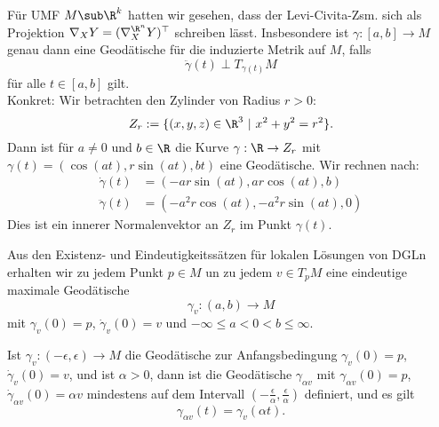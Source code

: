 \begin{beispiel}
Für UMF $M \sub \R^k$ hatten wir gesehen, dass der Levi-Civita-Zsm. sich als Projektion $\nabla_X Y = (\nabla_X^{\R^n} Y)^{\top}$ schreiben lässt. Insbesondere ist $\gamma: [a,b] \to M$ genau dann eine Geodätische für die induzierte Metrik auf $M$, falls 
\begin{equation}
\ddot{\gamma}(t) \perp T_{\gamma(t)} M
\end{equation} 
für alle $t \in [a,b]$ gilt.\\
Konkret: Wir betrachten den Zylinder von Radius $r>0$:
\begin{equation}
Z_r := \{ (x,y,z) \in \R^3 \ | \ x^2+y^2=r^2 \}.
\end{equation}
Dann ist für $a \neq 0$ und $b \in \R$ die Kurve $\gamma: \R \to Z_r$ mit $\gamma(t) = (\cos (at), r \sin (at), bt)$ eine Geodätische. Wir rechnen nach:
\begin{align}
\dot{\gamma}(t) &= (-ar \sin (at), ar \cos(at), b)\\
\ddot{\gamma}(t) &= (-a^2r \cos(at), -a^2 r \sin(at), 0)
\end{align}
Dies ist ein innerer Normalenvektor an $Z_r$ im Punkt $\gamma (t)$.
\end{beispiel}
Aus den Existenz- und Eindeutigkeitssätzen für lokalen Lösungen von DGLn erhalten wir zu jedem Punkt $p \in M$ un zu jedem $v \in T_pM$ eine eindeutige maximale Geodätische
\begin{equation}
\gamma_v : (a,b) \to M
\end{equation}
mit $\gamma_v(0)=p$, $\dot{\gamma}_v(0) = v$ und $- \infty \leq a <0 < b \leq \infty$.
\begin{lemma}{}{}
Ist $\gamma_v: (- \epsilon, \epsilon) \to M$ die Geodätische zur Anfangsbedingung $\gamma_v (0) = p$, $\dot{\gamma}_v(0) = v$, und ist $\alpha > 0$, dann ist die Geodätische $\gamma_{\alpha v}$ mit $\gamma_{\alpha v} (0) = p$, $\dot{\gamma}_{\alpha v} (0)= \alpha v$ mindestens auf dem Intervall $\left( -\frac{\epsilon}{\alpha}, \frac{\epsilon}{\alpha} \right)$ definiert, und es gilt
\begin{equation}
\gamma_{\alpha v} (t) = \gamma_v (\alpha t).
\end{equation}
\end{lemma}
